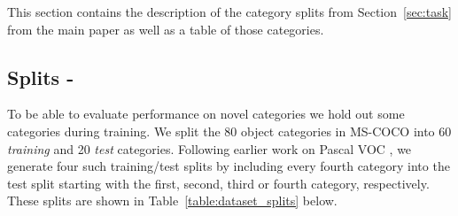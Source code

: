 \documentclass{article}
\newcommand{\coco}{MS-COCO\xspace}
\begin{document}
This section contains the description of the category splits from Section~\ref{sec:task} from the main paper as well as a table of those categories.

\subsection{Splits -}
To be able to evaluate performance on novel categories we hold out some categories during training. We split the 80 object categories in \coco into 60 \emph{training} and 20 \emph{test} categories.
Following earlier work on Pascal VOC \cite{Shaban2017}, we generate four such training/test splits by including every fourth category into the test split starting with the first, second, third or fourth category, respectively. These splits are shown in Table~\ref{table:dataset_splits} below.
\end{document}
